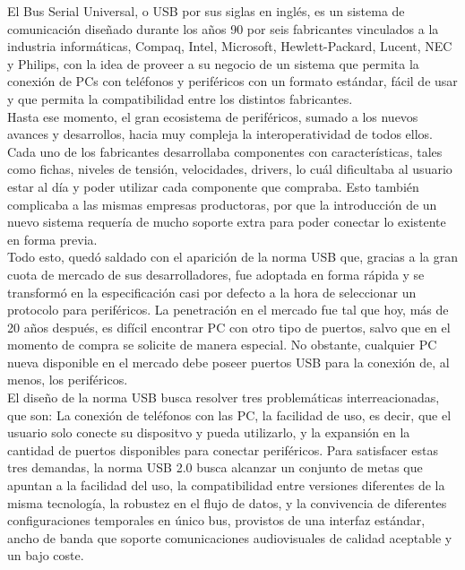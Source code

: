 El Bus Serial Universal, o USB por sus siglas en inglés, es un sistema de comunicación diseñado durante los años 90 por seis fabricantes vinculados a la industria informáticas, Compaq, Intel, Microsoft, Hewlett-Packard, Lucent, NEC y Philips, con la idea de proveer a su negocio de un sistema que permita la conexión de PCs con teléfonos y periféricos con un formato estándar, fácil de usar y que permita la compatibilidad entre los distintos fabricantes.\\

Hasta ese momento, el gran ecosistema de periféricos, sumado a los nuevos avances y desarrollos, hacia muy compleja la interoperatividad de todos ellos. Cada uno de los fabricantes desarrollaba componentes con características, tales como fichas, niveles de tensión, velocidades, drivers, lo cuál dificultaba al usuario estar al día y poder utilizar cada componente que compraba. Esto también complicaba a las mismas empresas productoras, por que la introducción de un nuevo sistema requería de mucho soporte extra para poder conectar lo existente en forma previa.\\

Todo esto, quedó saldado con el aparición de la norma USB que, gracias a la gran cuota de mercado de sus desarrolladores, fue adoptada en forma rápida y se transformó en la especificación casi por defecto a la hora de seleccionar un protocolo para periféricos. La penetración en el mercado fue tal que hoy, más de 20 años después, es difícil encontrar PC con otro tipo de puertos, salvo que en el momento de compra se solicite de manera especial. No obstante, cualquier PC nueva disponible en el mercado debe poseer puertos USB para la conexión de, al menos, los periféricos.\\

El diseño de la norma USB busca resolver tres problemáticas interreacionadas, que son: La conexión de teléfonos con las PC, la facilidad de uso, es decir, que el usuario solo conecte su dispositvo y pueda utilizarlo, y la expansión en la cantidad de puertos disponibles para conectar periféricos\cite{USBspec}. Para satisfacer estas tres demandas, la norma USB 2.0 busca alcanzar un conjunto de metas que apuntan a la facilidad del uso, la compatibilidad entre versiones diferentes de la misma tecnología, la robustez en el flujo de datos, y la convivencia de diferentes configuraciones temporales en único bus, provistos de una interfaz estándar, ancho de banda que soporte comunicaciones audiovisuales de calidad aceptable y un bajo coste.\\

